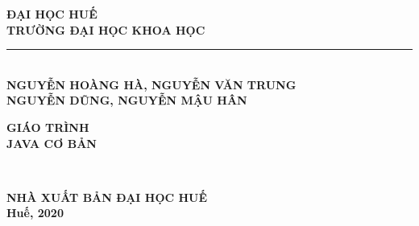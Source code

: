 \begin{titlepage}

\begin{center}
\vspace{-2.5cm}
\textsc{\fontsize{11.5}{12} \textbf{ĐẠI HỌC HUẾ}}\\
\vspace{-0.05cm}
{\fontsize{11.5}{12} \textbf{TRƯỜNG ĐẠI HỌC KHOA HỌC}}\\
\vspace{-0.45cm}
\rule{7.0cm}{0.25mm}\\[1.8cm]

\textsc{\fontsize{11}{12} \textbf{NGUYỄN HOÀNG HÀ, NGUYỄN VĂN TRUNG}}\\
\vspace{-0.05cm}
\textsc{\fontsize{11}{12} \textbf{ NGUYỄN DŨNG, NGUYỄN MẬU HÂN}}\\
\vspace{-0.05cm}


\vspace{5.0cm}
{\fontsize{18}{15} \bfseries GIÁO TRÌNH}\\[0.2cm]
{\fontsize{22}{15} \bfseries JAVA CƠ BẢN}\\[2.1cm]

\begin{minipage}{0.45\textwidth}
	\begin{flushleft}
		~
	\end{flushleft}
\end{minipage}
\begin{minipage}{0.50\textwidth}
	\begin{flushright}
	\end{flushright}
\end{minipage}

\vfill
{\fontsize{11.5}{15} \bf NHÀ XUẤT BẢN ĐẠI HỌC HUẾ}\\
\vspace{-0.05cm}
{\fontsize{12}{15} \bf Huế, 2020}\\
\vspace{-0.6cm}
\end{center}
\end{titlepage}

